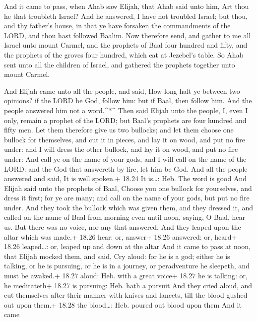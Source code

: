  And it came to pass, when Ahab saw Elijah, that Ahab said
unto him, Art thou he that troubleth Israel?  And he
answered, I have not troubled Israel; but thou, and thy father's house,
in that ye have forsaken the commandments of the LORD, and thou hast
followed Baalim.  Now therefore send, and gather to me all
Israel unto mount Carmel, and the prophets of Baal four hundred and
fifty, and the prophets of the groves four hundred, which eat at
Jezebel's table.  So Ahab sent unto all the children of
Israel, and gathered the prophets together unto mount Carmel.

 And Elijah came unto all the people, and said, How long
halt ye between two opinions? if the LORD be God, follow him: but if
Baal, then follow him. And the people answered him not a word.\^{}*\^{}
 Then said Elijah unto the people, I, even I only, remain a
prophet of the LORD; but Baal's prophets are four hundred and fifty men.
 Let them therefore give us two bullocks; and let them
choose one bullock for themselves, and cut it in pieces, and lay it on
wood, and put no fire under: and I will dress the other bullock, and lay
it on wood, and put no fire under:  And call ye on the name
of your gods, and I will call on the name of the LORD: and the God that
answereth by fire, let him be God. And all the people answered and said,
It is well spoken.+ 18.24 It is\ldots: Heb. The word is good
 And Elijah said unto the prophets of Baal, Choose you one
bullock for yourselves, and dress it first; for ye are many; and call on
the name of your gods, but put no fire under.  And they
took the bullock which was given them, and they dressed it, and called
on the name of Baal from morning even until noon, saying, O Baal, hear
us. But there was no voice, nor any that answered. And they leaped upon
the altar which was made.+ 18.26 hear: or, answer+ 18.26 answered: or,
heard+ 18.26 leaped\ldots: or, leaped up and down at the altar
 And it came to pass at noon, that Elijah mocked them, and
said, Cry aloud: for he is a god; either he is talking, or he is
pursuing, or he is in a journey, or peradventure he sleepeth, and must
be awaked.+ 18.27 aloud: Heb. with a great voice+ 18.27 he is talking:
or, he meditateth+ 18.27 is pursuing: Heb. hath a pursuit 
And they cried aloud, and cut themselves after their manner with knives
and lancets, till the blood gushed out upon them.+ 18.28 the
blood\ldots: Heb. poured out blood upon them  And it came
